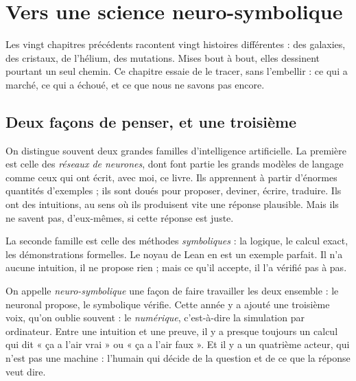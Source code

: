 \xdef\labelcourant{ch:neurosymbolique}
\chapter{Vers une science neuro-symbolique}

Les vingt chapitres précédents racontent vingt histoires différentes : des galaxies, des cristaux, de l'hélium, des
mutations. Mises bout à bout, elles dessinent pourtant un seul chemin. Ce chapitre essaie de le tracer, sans
l'embellir : ce qui a marché, ce qui a échoué, et ce que nous ne savons pas encore.

\section{Deux façons de penser, et une troisième}

On distingue souvent deux grandes familles d'intelligence artificielle. La première est celle des \emph{réseaux de
neurones}, dont font partie les grands modèles de langage comme ceux qui ont écrit, avec moi, ce livre. Ils apprennent
à partir d'énormes quantités d'exemples ; ils sont doués pour proposer, deviner, écrire, traduire. Ils ont des
intuitions, au sens où ils produisent vite une réponse plausible. Mais ils ne savent pas, d'eux-mêmes, si cette
réponse est juste.

La seconde famille est celle des méthodes \emph{symboliques} : la logique, le calcul exact, les démonstrations
formelles. Le noyau de Lean en est un exemple parfait. Il n'a aucune intuition, il ne propose rien ; mais ce qu'il
accepte, il l'a vérifié pas à pas.

On appelle \emph{neuro-symbolique} une façon de faire travailler les deux ensemble : le neuronal propose, le
symbolique vérifie. Cette année y a ajouté une troisième voix, qu'on oublie souvent : le \emph{numérique}, c'est-à-dire
la simulation par ordinateur. Entre une intuition et une preuve, il y a presque toujours un calcul qui dit « ça a l'air
vrai » ou « ça a l'air faux ». Et il y a un quatrième acteur, qui n'est pas une machine : l'humain qui décide de la
question et de ce que la réponse veut dire.

